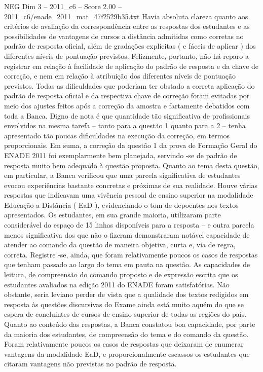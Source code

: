 \begin{textsample}{NEG Dim 3 – 2011\_c6 – Score 2.00 – 2011\_c6/enade\_2011\_mat\_47f2529b35.txt}
Havia absoluta clareza quanto aos critérios de avaliação da correspondência entre as respostas dos estudantes e as possibilidades de vantagens de cursos a distância admitidas como corretas no padrão de resposta oficial, além de gradações explícitas ( e fáceis de aplicar ) dos diferentes níveis de pontuação previstos.
Felizmente, portanto, não há reparo a registrar em relação à facilidade de aplicação do padrão de resposta e da chave de correção, e nem em relação à atribuição dos diferentes níveis de pontuação previstos.
Todas as dificuldades que poderiam ter obstado a correta aplicação do padrão de resposta oficial e da respectiva chave de correção foram evitadas por meio dos ajustes feitos após a correção da amostra e fartamente debatidos com toda a Banca.
Digno de nota é que quantidade tão significativa de profissionais envolvidos na mesma tarefa – tanto para a questão 1 quanto para a 2 – tenha apresentado tão poucas dificuldades na execução da correção, em termos proporcionais.
Em suma, a correção da questão 1 da prova de Formação Geral do ENADE 2011 foi exemplarmente bem planejada, servindo -se de padrão de resposta muito bem adequado à questão proposta.
Quanto ao tema desta questão, em particular, a Banca verificou que uma parcela significativa de estudantes evocou experiências bastante concretas e próximas de sua realidade.
Houve várias respostas que indicavam uma vivência pessoal de ensino superior na modalidade Educação a Distância ( EaD ), evidenciando o tom de depoentes nos textos apresentados.
Os estudantes, em sua grande maioria, utilizaram parte considerável do espaço de 15 linhas disponíveis para a resposta – e outra parcela menos significativa dos que não o fizeram demonstraram notável capacidade de atender ao comando da questão de maneira objetiva, curta e, via de regra, correta.
Registre -se, ainda, que foram relativamente poucos os casos de respostas que tenham passado ao largo do tema em pauta na questão.
As capacidades de leitura, de compreensão do comando proposto e de expressão escrita que os estudantes avaliados na edição 2011 do ENADE foram satisfatórias.
Não obstante, seria leviano perder de vista que a qualidade dos textos redigidos em resposta às questões discursivas do Exame ainda está muito aquém do que se espera de concluintes de cursos de ensino superior de todas as regiões do país.
Quanto ao conteúdo das respostas, a Banca constatou boa capacidade, por parte da maioria dos estudantes, de compreensão do tema e do comando da questão.
Foram relativamente poucos os casos de respostas que deixaram de enumerar vantagens da modalidade EaD, e proporcionalmente escassos os estudantes que citaram vantagens não previstas no padrão de resposta.

\end{textsample}
